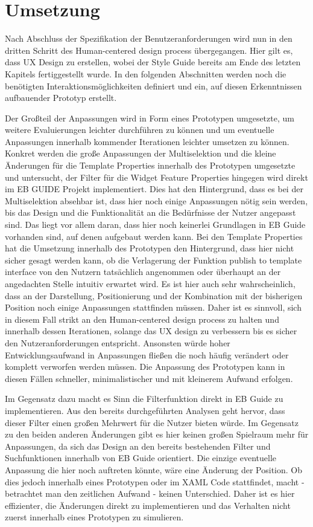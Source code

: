 \chapter{Umsetzung}\label{ch:experiments}

Nach Abschluss der Spezifikation der Benutzeranforderungen wird nun in den dritten Schritt des Human-centered design process übergegangen.
Hier gilt es, dass UX Design zu erstellen, wobei der Style Guide bereits am Ende des letzten Kapitels fertiggestellt wurde.
In den folgenden Abschnitten werden noch die benötigten Interaktionsmöglichkeiten definiert und ein, auf diesen Erkenntnissen aufbauender Prototyp erstellt.

Der Großteil der Anpassungen wird in Form eines Prototypen umgesetzte, um weitere Evaluierungen leichter durchführen zu können und um eventuelle Anpassungen innerhalb kommender Iterationen leichter umsetzen zu können.
Konkret werden die große Anpassungen der Multiselektion und die kleine Änderungen für die Template Properties innerhalb des Prototypen umgesetzte und untersucht, der Filter für die Widget Feature Properties hingegen wird direkt im EB GUIDE Projekt implementiert.
Dies hat den Hintergrund, dass es bei der Multiselektion absehbar ist, dass hier noch einige Anpassungen nötig sein werden, bis das Design und die Funktionalität an die Bedürfnisse der Nutzer angepasst sind.
Das liegt vor allem daran, dass hier noch keinerlei Grundlagen in EB Guide vorhanden sind, auf denen aufgebaut werden kann.
Bei den Template Properties hat die Umsetzung innerhalb des Prototypen den Hintergrund, dass hier nicht sicher gesagt werden kann, ob die Verlagerung der Funktion \glqq publish to template interface\grqq{} von den Nutzern tatsächlich angenommen oder überhaupt an der angedachten Stelle intuitiv erwartet wird.
Es ist hier auch sehr wahrscheinlich, dass an der Darstellung, Positionierung und der Kombination mit der bisherigen Position noch einige Anpassungen stattfinden müssen.
Daher ist es sinnvoll, sich in diesem Fall strikt an den Human-centered design process zu halten und innerhalb dessen Iterationen, solange das UX design zu verbessern bis es sicher den Nutzeranforderungen entspricht.
Ansonsten würde hoher Entwicklungsaufwand in Anpassungen fließen die noch häufig verändert oder komplett verworfen werden müssen.
Die Anpassung des Prototypen kann in diesen Fällen schneller, minimalistischer und mit kleinerem Aufwand erfolgen.

Im Gegensatz dazu macht es Sinn die Filterfunktion direkt in EB Guide zu implementieren.
Aus den bereits durchgeführten Analysen geht hervor, dass dieser Filter einen großen Mehrwert für die Nutzer bieten würde.
Im Gegensatz zu den beiden anderen Änderungen gibt es hier keinen großen Spielraum mehr für Anpassungen, da sich das Design an den bereits bestehenden Filter und Suchfunktionen innerhalb von EB Guide orientiert.
Die einzige eventuelle Anpassung die hier noch auftreten könnte, wäre eine Änderung der Position.
Ob dies jedoch innerhalb eines Prototypen oder im XAML Code stattfindet, macht - betrachtet man den zeitlichen Aufwand - keinen Unterschied.
Daher ist es hier effizienter, die Änderungen direkt zu implementieren und das Verhalten nicht zuerst innerhalb eines Prototypen zu simulieren.

